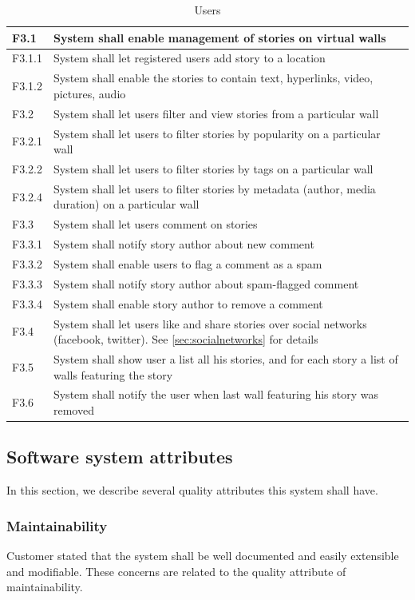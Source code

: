 \documentclass[11pt]{book}
\begin{document}
\begin{table}[H]
\centering
\begin{tabular}{ l  p{11cm} }
F3.1 & System shall enable management of stories on virtual walls\\
\hline
F3.1.1 & System shall let registered users add story to a location\\
\hline
F3.1.2 & System shall enable the stories to contain text, hyperlinks, video, pictures, audio\\
\hline
F3.2 & System shall let users filter and view stories from a particular wall\\
\hline
F3.2.1 & System shall let users to filter stories by popularity on a particular wall\\
\hline
F3.2.2 & System shall let users to filter stories by tags on a particular wall\\
\hline
F3.2.4 & System shall let users to filter stories by metadata (author, media duration) on a particular wall\\
\hline
F3.3 & System shall let users comment on stories\\
\hline
F3.3.1 & System shall notify story author about new comment\\
\hline
F3.3.2 & System shall enable users to flag a comment as a spam\\
\hline
F3.3.3 & System shall notify story author about spam-flagged comment\\
\hline
F3.3.4 & System shall enable story author to remove a comment\\
\hline
F3.4 & System shall let users like and share stories over social networks (facebook, twitter). See \ref{sec:socialnetworks} for details\\
\hline
F3.5 & System shall show user a list all his stories, and for each story a list of walls featuring the story\\
\hline
F3.6 & System shall notify the user when last wall featuring his story was removed
\end{tabular}
\label{tab:requirements_stories}
\caption{Users}
\end{table}

\subsection{Software system attributes}\label{sec:softwaresystemattributes}
In this section, we describe several quality attributes this system shall have.

\subsubsection{Maintainability}
Customer stated that the system shall be well documented and easily extensible and modifiable. These concerns are related to the quality attribute of maintainability.
\end{document}
